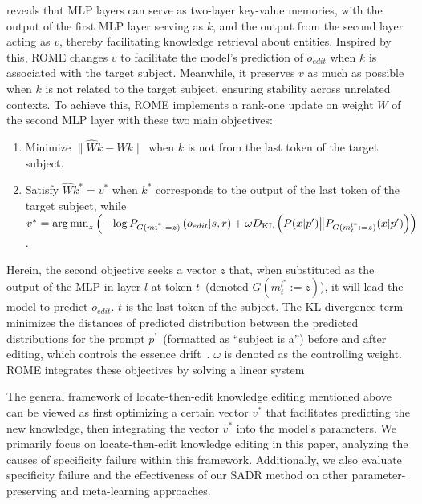 \citet{geva2021transformer} reveals that MLP layers can serve as two-layer key-value memories, with the output of the first MLP layer serving as $k$, and the output from the second layer acting as $v$, thereby facilitating knowledge retrieval about entities.
Inspired by this, ROME changes $v$ to facilitate the model’s prediction of $o_{edit}$ when $k$ is associated with the target subject.
Meanwhile, it preserves $v$ as much as possible when $k$ is not related to the target subject, ensuring stability across unrelated contexts. 
To achieve this, ROME implements a rank-one update on weight $W$ of the second MLP layer with these two main objectives:
\begin{enumerate}[label=\arabic*, itemsep=1pt, wide=0pt, leftmargin=*]
\item Minimize $\lVert \hat{W}k - Wk \rVert$ when $k$ is not from the last token of the target subject.
\item Satisfy $\hat{W}k^* = v^*$ when $k^*$ corresponds to the output of the last token of the target subject, while $v^* = \operatorname*{arg\,min}_z \left( -\log P_{G(m^{l^*}_{t}:=z)}\left(o_{edit}|s,r\right) + \omega D_{\mathrm{KL}}\left(P(x|p') \big\Vert P_{G(m^{l^*}_{t}:=z)}(x|p')\right) \right)$.
\end{enumerate}
Herein, the second objective seeks a vector $z$ that, when substituted as the output of the MLP  in layer $l$ at token $t$~(denoted $G(m^{l^*}_{t}:=z)$), it will lead the model to predict $o_{edit}$. 
$t$ is the last token of the subject.
The KL divergence term minimizes the distances of predicted distribution between the predicted distributions for the prompt $p^\prime$~(formatted as “{subject} is a”) before and after editing, which controls the essence drift~\citep{rome}.
$\omega$ is denoted as the controlling weight. 
ROME integrates these objectives by solving a linear system. 

The general framework of locate-then-edit knowledge editing mentioned above can be viewed as first optimizing a certain vector $v^*$ that facilitates predicting the new knowledge, then integrating the vector $v^*$ into the model's parameters.
We primarily focus on locate-then-edit knowledge editing in this paper, analyzing the causes of specificity failure within this framework. 
Additionally, we also evaluate specificity failure and the effectiveness of our SADR method on other parameter-preserving and meta-learning approaches.
